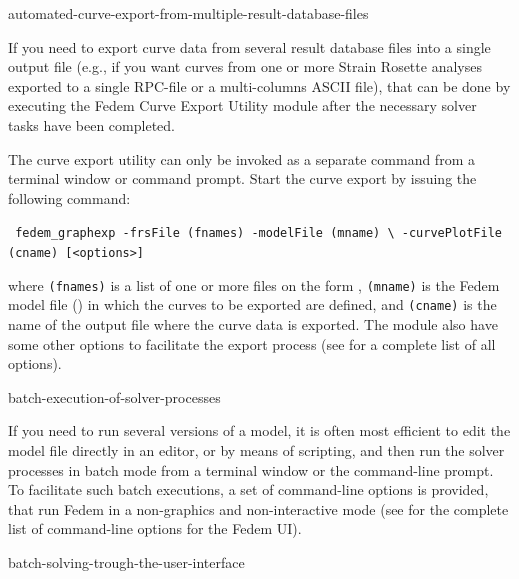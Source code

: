 {


        {automated-curve-export-from-multiple-result-database-files}

If you need to export curve data from several result database files into
a single output file (e.g., if you want curves from one or more Strain Rosette
analyses exported to a single RPC-file or a multi-columns ASCII file),
that can be done by executing the Fedem Curve Export Utility module after the
necessary solver tasks have been completed.

The curve export utility can only be invoked as a separate command from
a terminal window or command prompt.
Start the curve export by issuing the following command:

\texttt{
  fedem\_graphexp -frsFile (fnames) -modelFile (mname) \textbackslash
  \newline\hspace*{32mm}
  -curvePlotFile (cname) [\textless options\textgreater]}

\noindent
where {\tt(fnames)} is a list of one or more  files on the form
, {\tt(mname)} is the Fedem model
file () in which the curves to be exported are defined, and
{\tt(cname)} is the name of the output file where the curve data is exported.
The module also have some other options to facilitate the export process
(see 
for a complete list of all options).


        {batch-execution-of-solver-processes}

If you need to run several versions of a model, it is often most efficient to
edit the model file directly in an editor, or by means of scripting, and then
run the solver processes in batch mode from a terminal window or the
command-line prompt. To facilitate such batch executions, a set of command-line
options is provided, that run Fedem in a non-graphics and non-interactive mode
(see  for the complete list
of command-line options for the Fedem UI).


           {batch-solving-trough-the-user-interface}

}
